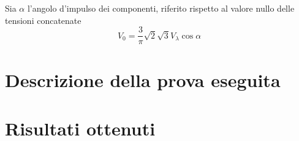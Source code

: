 \documentclass[a4paper,10pt]{article}
\begin{document}

Sia \(\alpha\) l'angolo d'impulso dei componenti, riferito rispetto al valore nullo
delle tensioni concatenate
\begin{equation}
 V_0 = \frac{3}{\pi} \sqrt{2} \sqrt{3} V_\lambda \cos\alpha
 \label{eq:valore_medio_tensione_ponte}
\end{equation}


\section{Descrizione della prova eseguita}

\section{Risultati ottenuti}
\end{document}
